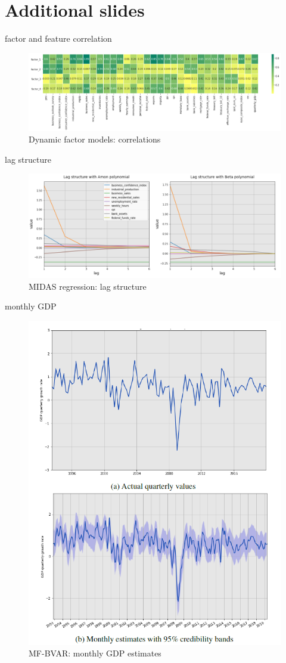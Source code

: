 \section{Additional slides}

\begin{frame}{factor and feature correlation}
\begin{figure}[h]
	\centering
	\includegraphics[width=.95\linewidth]{im8}
	\caption{Dynamic factor models: correlations}
	\label{fig_app_1}
\end{figure}
\end{frame}

\begin{frame}{lag structure}
\begin{figure}[h]
	\centering
	\includegraphics[width=1\linewidth]{im9}
	\caption{MIDAS regression: lag structure}
	\label{fig_app_2}
\end{figure}
\end{frame}

\begin{frame}{monthly GDP}
\begin{figure}[h]
	\centering
	\includegraphics[width=.5\linewidth]{im10}
	\caption{MF-BVAR: monthly GDP estimates}
	\label{fig_app_3}
\end{figure}
\end{frame}

